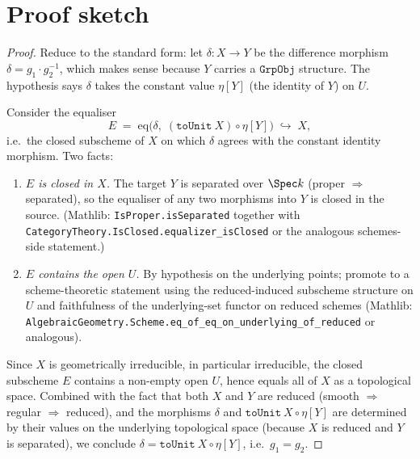 \section{Proof sketch}

\begin{proof}
  \leanok
  Reduce to the standard form: let $\delta \colon X \to Y$ be the difference morphism $\delta = g_1 \cdot g_2^{-1}$, which makes sense because $Y$ carries a $\mathtt{GrpObj}$ structure. The hypothesis says $\delta$ takes the constant value $\eta[Y]$ (the identity of $Y$) on $U$.

  Consider the equaliser
  \[
    E \;=\; \mathrm{eq}\bigl(\delta,\; (\mathtt{toUnit}\ X) \circ \eta[Y]\bigr) \;\hookrightarrow\; X,
  \]
  i.e.\ the closed subscheme of $X$ on which $\delta$ agrees with the constant identity morphism. Two facts:
  \begin{enumerate}
    \item \emph{$E$ is closed in $X$.} The target $Y$ is separated over $\Spec k$ (proper $\Rightarrow$ separated), so the equaliser of any two morphisms into $Y$ is closed in the source. (Mathlib: \lstinline{IsProper.isSeparated} together with \lstinline{CategoryTheory.IsClosed.equalizer_isClosed} or the analogous schemes-side statement.)
    \item \emph{$E$ contains the open $U$.} By hypothesis on the underlying points; promote to a scheme-theoretic statement using the reduced-induced subscheme structure on $U$ and faithfulness of the underlying-set functor on reduced schemes (Mathlib: \lstinline{AlgebraicGeometry.Scheme.eq_of_eq_on_underlying_of_reduced} or analogous).
  \end{enumerate}
  Since $X$ is geometrically irreducible, in particular irreducible, the closed subscheme $E$ contains a non-empty open $U$, hence equals all of $X$ as a topological space. Combined with the fact that both $X$ and $Y$ are reduced (smooth $\Rightarrow$ regular $\Rightarrow$ reduced), and the morphisms $\delta$ and $\mathtt{toUnit}\ X \circ \eta[Y]$ are determined by their values on the underlying topological space (because $X$ is reduced and $Y$ is separated), we conclude $\delta = \mathtt{toUnit}\ X \circ \eta[Y]$, i.e.\ $g_1 = g_2$.


\end{proof}
